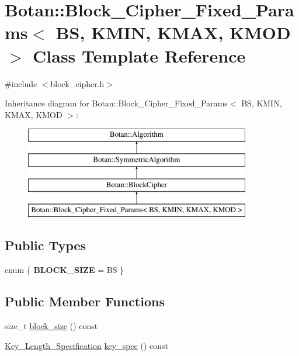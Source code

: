 \hypertarget{classBotan_1_1Block__Cipher__Fixed__Params}{\section{Botan\-:\-:Block\-\_\-\-Cipher\-\_\-\-Fixed\-\_\-\-Params$<$ B\-S, K\-M\-I\-N, K\-M\-A\-X, K\-M\-O\-D $>$ Class Template Reference}
\label{classBotan_1_1Block__Cipher__Fixed__Params}
}


{\ttfamily \#include $<$block\-\_\-cipher.\-h$>$}

Inheritance diagram for Botan\-:\-:Block\-\_\-\-Cipher\-\_\-\-Fixed\-\_\-\-Params$<$ B\-S, K\-M\-I\-N, K\-M\-A\-X, K\-M\-O\-D $>$\-:\begin{figure}[H]
\begin{center}
\leavevmode
\includegraphics[height=4.000000cm]{classBotan_1_1Block__Cipher__Fixed__Params}
\end{center}
\end{figure}
\subsection*{Public Types}
\begin{DoxyCompactItemize}
\item 
enum \{ {\bfseries B\-L\-O\-C\-K\-\_\-\-S\-I\-Z\-E} = B\-S
 \}
\end{DoxyCompactItemize}
\subsection*{Public Member Functions}
\begin{DoxyCompactItemize}
\item 
size\-\_\-t \hyperlink{classBotan_1_1Block__Cipher__Fixed__Params_a2827f84e563c3cabe7b337492fac46c6}{block\-\_\-size} () const 
\item 
\hyperlink{classBotan_1_1Key__Length__Specification}{Key\-\_\-\-Length\-\_\-\-Specification} \hyperlink{classBotan_1_1Block__Cipher__Fixed__Params_a585d9f6c14f0f09c93636c1f97197a94}{key\-\_\-spec} () const 
\end{DoxyCompactItemize}


